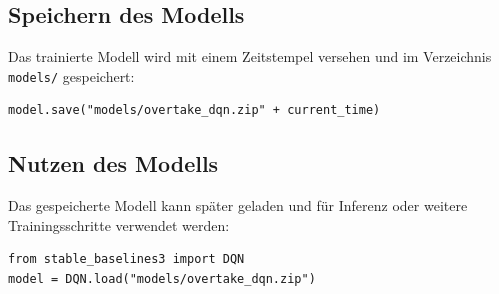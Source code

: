 \subsection{Speichern des Modells}
Das trainierte Modell wird mit einem Zeitstempel versehen und im Verzeichnis \texttt{models/} gespeichert:
\begin{lstlisting}
model.save("models/overtake_dqn.zip" + current_time)
\end{lstlisting}

\subsection{Nutzen des Modells}
Das gespeicherte Modell kann später geladen und für Inferenz oder weitere Trainingsschritte verwendet werden:
\begin{lstlisting}
from stable_baselines3 import DQN
model = DQN.load("models/overtake_dqn.zip")
\end{lstlisting}